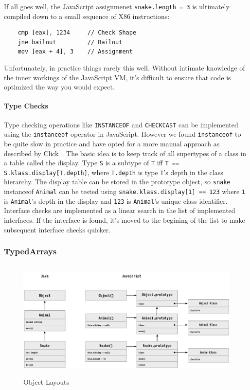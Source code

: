 \documentclass{acm_proc_article-sp}
\begin{document}
If all goes well, the JavaScript assignmenet \texttt{snake.length = 3} is ultimately compiled down to a small sequence of X86 instructions: 
\begin{verbatim}
	cmp [eax], 1234 	// Check Shape
	jne bailout     	// Bailout
	mov [eax + 4], 3	// Assignment
\end{verbatim}
Unfortunately, in practice things rarely this well.
Without intimate knowledge of the inner workings of the JavaScript VM, it's difficult to ensure that code is optimized the way you would expect.

\paragraph{Type Checks}

Type checking operations like \texttt{INSTANCEOF} and \texttt{CHECKCAST} can be implemented using the \texttt{instanceof} operator in JavaScript.
However we found \texttt{instanceof} to be quite slow in practice and have opted for a more manual approach as described by Click~\cite{Click2002}.
The basic idea is to keep track of all supertypes of a class in a table called the display.
Type \texttt{S} is a subtype of \texttt{T} iff \texttt{T == S.klass.display[T.depth]}, where \texttt{T.depth} is type \texttt{T}'s depth in the class hierarchy. The display table can be stored in the prototype object, so \texttt{snake} instanceof \texttt{Animal} can be tested using \texttt{snake.klass.display[1] == 123} where \texttt{1} is \texttt{Animal}'s depth in the display and \texttt{123} is \texttt{Animal}'s unique class identifier.
Interface checks are implemented as a linear search in the list of implemented interfaces.
If the interface is found, it's moved to the begining of the list to make subsequent interface checks quicker.

\subsubsection{TypedArrays}


\begin{figure}[]
\begin{center}
\includegraphics[height=6cm]{objects.pdf}
\caption{Object Layouts}
\label{fig:objects}
\end{center}
\end{figure}
\end{document}

